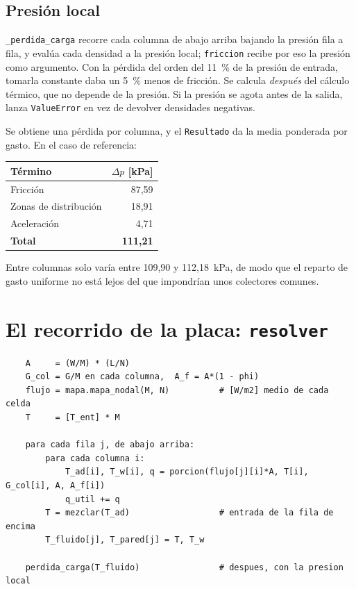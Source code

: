 \documentclass[11pt,a4paper]{article}
\begin{document}
\subsection{Presión local}

\texttt{\_perdida\_carga} recorre cada columna de abajo arriba bajando la
presión fila a fila, y evalúa cada densidad a la presión local; \texttt{friccion}
recibe por eso la presión como argumento. Con la pérdida del orden del 11~\% de
la presión de entrada, tomarla constante daba un 5~\% menos de fricción. Se
calcula \emph{después} del cálculo térmico, que no depende de la presión. Si la
presión se agota antes de la salida, lanza \texttt{ValueError} en vez de
devolver densidades negativas.

Se obtiene una pérdida por columna, y el \texttt{Resultado} da la media ponderada
por gasto. En el caso de referencia:

\begin{center}
\begin{tabular}{lr}
  \toprule
  Término & $\Delta p$ [kPa] \\
  \midrule
  Fricción                & 87,59 \\
  Zonas de distribución   & 18,91 \\
  Aceleración             &  4,71 \\
  \midrule
  \textbf{Total}          & \textbf{111,21} \\
  \bottomrule
\end{tabular}
\end{center}

Entre columnas solo varía entre 109,90 y 112,18~kPa, de modo que el reparto de
gasto uniforme no está lejos del que impondrían unos colectores comunes.

\section{El recorrido de la placa: \texttt{resolver}}

\begin{verbatim}
    A     = (W/M) * (L/N)
    G_col = G/M en cada columna,  A_f = A*(1 - phi)
    flujo = mapa.mapa_nodal(M, N)          # [W/m2] medio de cada celda
    T     = [T_ent] * M

    para cada fila j, de abajo arriba:
        para cada columna i:
            T_ad[i], T_w[i], q = porcion(flujo[j][i]*A, T[i], G_col[i], A, A_f[i])
            q_util += q
        T = mezclar(T_ad)                  # entrada de la fila de encima
        T_fluido[j], T_pared[j] = T, T_w

    perdida_carga(T_fluido)                # despues, con la presion local
\end{verbatim}
\end{document}

